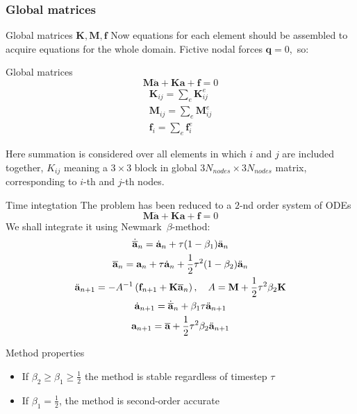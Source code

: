 \documentclass[10pt]{beamer}
\newcommand{\MM}{\mathbf{M}}
\newcommand{\KM}{\mathbf{K}}
\newcommand{\fM}{\mathbf{f}}
\newcommand{\aM}{\mathbf{a}}
\numberwithin{equation}{subsection}
\begin{document}
\subsubsection{Global matrices}
\begin{frame}{Global matrices $\mathbf{K}, \mathbf{M}, \mathbf{f}$}
    Now equations for each element should be \alert{assembled} to acquire equations for the whole domain. Fictive nodal forces 
    $\mathbf{q}=0$,~so:
    \begin{alertblock}{Global matrices}
        \begin{equation}
            \MM\ddot{\mathbf{a}} + \KM\aM + \fM = 0
        \end{equation}
        \begin{gather}
            \KM_{ij} = \sum_{e}\KM^e_{ij} \\
            \MM_{ij} = \sum_{e}\MM^e_{ij} \\
            \fM_i = \sum_{e}\fM^e_{i}
        \end{gather}
    \end{alertblock}
    Here summation is considered over all elements in which $i$ and $j$ are included together, 
    $K_{ij}$ meaning a $3\times3$ block in global $3N_{nodes}\times3N_{nodes}$ matrix, corresponding to $i$-th and $j$-th nodes.
\end{frame}

\begin{frame}{Time integtation}
The problem has been reduced to a $2$-nd order system of ODEs
    \begin{equation*}
        \MM\ddot{\mathbf{a}} + \KM\aM + \fM = 0
    \end{equation*}
We shall integrate it using Newmark~$\beta$-method:
    \begin{gather}
        \dot{\overline{\aM}}_n = \dot{\aM}_n + \tau(1-\beta_1)\ddot{\aM}_n \notag\\
        \overline{\aM}_n = \aM_n + \tau\dot{\aM}_n 
                + \frac12\tau^2(1 - \beta_2)\ddot{\aM}_n \notag\\
        \ddot{\aM}_{n+1} = - A^{-1}\left(\fM_{n+1} +\KM\overline{\aM}_n
                        \right),\quad A = \MM + \frac{1}{2}\tau^2\beta_2\KM\\
        \dot{\aM}_{n+1} = \dot{\overline{\aM}}_n + \beta_1\tau\ddot{\aM}_{n+1} \notag\\
        \aM_{n+1} = \overline{\aM} + \frac{1}{2}\tau^2\beta_2\ddot{\aM}_{n+1} \notag
    \end{gather}
\vspace{-8pt}
\begin{alertblock}{Method properties}
    \begin{itemize}
        \item If $\beta_2 \geq \beta_1 \geq \frac12$ the method is stable regardless of timestep $\tau$
        \item If $\beta_1 = \frac{1}{2}$, the method is second-order accurate \cite{newmark1959method}
        \end{itemize}
    \end{alertblock}
\end{frame}
\end{document}
